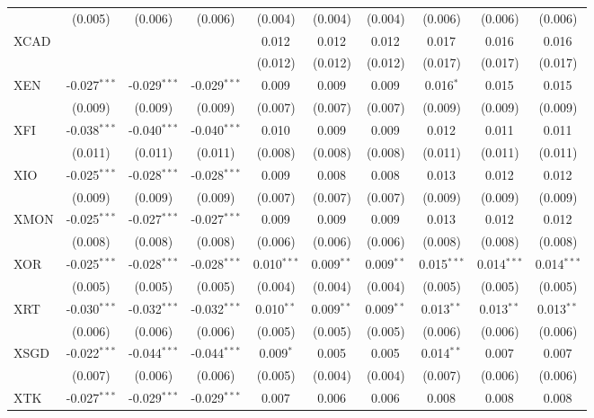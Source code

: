 \begin{table}[!htbp]
\begin{tabular}{@{\extracolsep{5pt}}lccccccccc}
  & (0.005) & (0.006) & (0.006) & (0.004) & (0.004) & (0.004) & (0.006) & (0.006) & (0.006) \\
 XCAD & & & & 0.012$^{}$ & 0.012$^{}$ & 0.012$^{}$ & 0.017$^{}$ & 0.016$^{}$ & 0.016$^{}$ \\
  & & & & (0.012) & (0.012) & (0.012) & (0.017) & (0.017) & (0.017) \\
 XEN & -0.027$^{***}$ & -0.029$^{***}$ & -0.029$^{***}$ & 0.009$^{}$ & 0.009$^{}$ & 0.009$^{}$ & 0.016$^{*}$ & 0.015$^{}$ & 0.015$^{}$ \\
  & (0.009) & (0.009) & (0.009) & (0.007) & (0.007) & (0.007) & (0.009) & (0.009) & (0.009) \\
 XFI & -0.038$^{***}$ & -0.040$^{***}$ & -0.040$^{***}$ & 0.010$^{}$ & 0.009$^{}$ & 0.009$^{}$ & 0.012$^{}$ & 0.011$^{}$ & 0.011$^{}$ \\
  & (0.011) & (0.011) & (0.011) & (0.008) & (0.008) & (0.008) & (0.011) & (0.011) & (0.011) \\
 XIO & -0.025$^{***}$ & -0.028$^{***}$ & -0.028$^{***}$ & 0.009$^{}$ & 0.008$^{}$ & 0.008$^{}$ & 0.013$^{}$ & 0.012$^{}$ & 0.012$^{}$ \\
  & (0.009) & (0.009) & (0.009) & (0.007) & (0.007) & (0.007) & (0.009) & (0.009) & (0.009) \\
 XMON & -0.025$^{***}$ & -0.027$^{***}$ & -0.027$^{***}$ & 0.009$^{}$ & 0.009$^{}$ & 0.009$^{}$ & 0.013$^{}$ & 0.012$^{}$ & 0.012$^{}$ \\
  & (0.008) & (0.008) & (0.008) & (0.006) & (0.006) & (0.006) & (0.008) & (0.008) & (0.008) \\
 XOR & -0.025$^{***}$ & -0.028$^{***}$ & -0.028$^{***}$ & 0.010$^{***}$ & 0.009$^{**}$ & 0.009$^{**}$ & 0.015$^{***}$ & 0.014$^{***}$ & 0.014$^{***}$ \\
  & (0.005) & (0.005) & (0.005) & (0.004) & (0.004) & (0.004) & (0.005) & (0.005) & (0.005) \\
 XRT & -0.030$^{***}$ & -0.032$^{***}$ & -0.032$^{***}$ & 0.010$^{**}$ & 0.009$^{**}$ & 0.009$^{**}$ & 0.013$^{**}$ & 0.013$^{**}$ & 0.013$^{**}$ \\
  & (0.006) & (0.006) & (0.006) & (0.005) & (0.005) & (0.005) & (0.006) & (0.006) & (0.006) \\
 XSGD & -0.022$^{***}$ & -0.044$^{***}$ & -0.044$^{***}$ & 0.009$^{*}$ & 0.005$^{}$ & 0.005$^{}$ & 0.014$^{**}$ & 0.007$^{}$ & 0.007$^{}$ \\
  & (0.007) & (0.006) & (0.006) & (0.005) & (0.004) & (0.004) & (0.007) & (0.006) & (0.006) \\
 XTK & -0.027$^{***}$ & -0.029$^{***}$ & -0.029$^{***}$ & 0.007$^{}$ & 0.006$^{}$ & 0.006$^{}$ & 0.008$^{}$ & 0.008$^{}$ & 0.008$^{}$ \\

\end{tabular}
\end{table}
